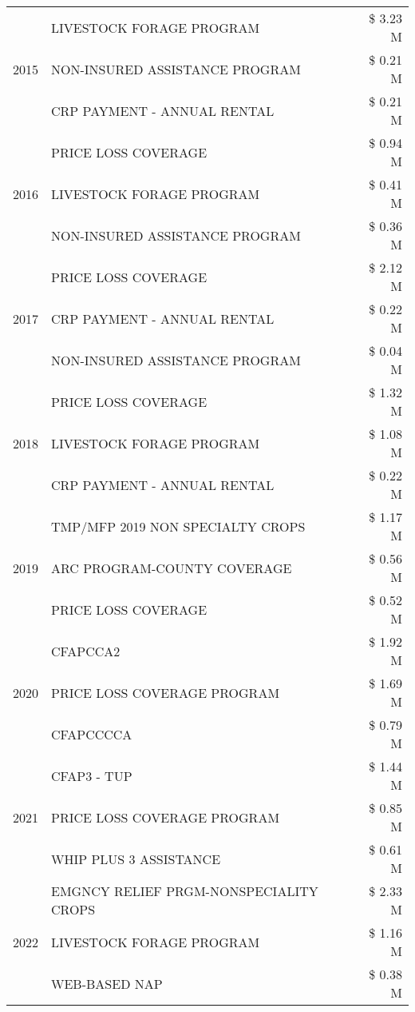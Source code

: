 \begin{tabular}{llr}
\cline{1-3}
\multirow[t]{3}{*}{2015} & LIVESTOCK FORAGE PROGRAM & \$ 3.23 M \\
 & NON-INSURED ASSISTANCE PROGRAM & \$ 0.21 M \\
 & CRP PAYMENT - ANNUAL RENTAL & \$ 0.21 M \\
\cline{1-3}
\multirow[t]{3}{*}{2016} & PRICE LOSS COVERAGE & \$ 0.94 M \\
 & LIVESTOCK FORAGE PROGRAM & \$ 0.41 M \\
 & NON-INSURED ASSISTANCE PROGRAM & \$ 0.36 M \\
\cline{1-3}
\multirow[t]{3}{*}{2017} & PRICE LOSS COVERAGE & \$ 2.12 M \\
 & CRP PAYMENT - ANNUAL RENTAL & \$ 0.22 M \\
 & NON-INSURED ASSISTANCE PROGRAM & \$ 0.04 M \\
\cline{1-3}
\multirow[t]{3}{*}{2018} & PRICE LOSS COVERAGE & \$ 1.32 M \\
 & LIVESTOCK FORAGE PROGRAM & \$ 1.08 M \\
 & CRP PAYMENT - ANNUAL RENTAL & \$ 0.22 M \\
\cline{1-3}
\multirow[t]{3}{*}{2019} & TMP/MFP 2019 NON SPECIALTY CROPS & \$ 1.17 M \\
 & ARC PROGRAM-COUNTY COVERAGE & \$ 0.56 M \\
 & PRICE LOSS COVERAGE & \$ 0.52 M \\
\cline{1-3}
\multirow[t]{3}{*}{2020} & CFAPCCA2 & \$ 1.92 M \\
 & PRICE LOSS COVERAGE PROGRAM & \$ 1.69 M \\
 & CFAPCCCCA & \$ 0.79 M \\
\cline{1-3}
\multirow[t]{3}{*}{2021} & CFAP3 - TUP & \$ 1.44 M \\
 & PRICE LOSS COVERAGE PROGRAM & \$ 0.85 M \\
 & WHIP PLUS 3 ASSISTANCE & \$ 0.61 M \\
\cline{1-3}
\multirow[t]{3}{*}{2022} & EMGNCY RELIEF PRGM-NONSPECIALITY CROPS & \$ 2.33 M \\
 & LIVESTOCK FORAGE PROGRAM & \$ 1.16 M \\
 & WEB-BASED NAP & \$ 0.38 M \\
\cline{1-3}
\bottomrule
\end{tabular}
